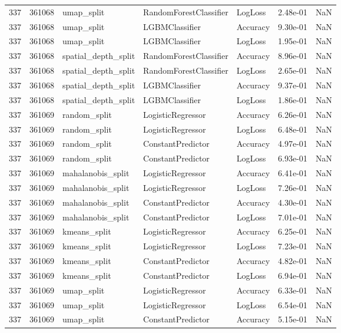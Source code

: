 \begin{tabular}{rrlllrr}
337 & 361068 & umap\_split & RandomForestClassifier & LogLoss & 2.48e-01 & NaN \\
337 & 361068 & umap\_split & LGBMClassifier & Accuracy & 9.30e-01 & NaN \\
337 & 361068 & umap\_split & LGBMClassifier & LogLoss & 1.95e-01 & NaN \\
337 & 361068 & spatial\_depth\_split & RandomForestClassifier & Accuracy & 8.96e-01 & NaN \\
337 & 361068 & spatial\_depth\_split & RandomForestClassifier & LogLoss & 2.65e-01 & NaN \\
337 & 361068 & spatial\_depth\_split & LGBMClassifier & Accuracy & 9.37e-01 & NaN \\
337 & 361068 & spatial\_depth\_split & LGBMClassifier & LogLoss & 1.86e-01 & NaN \\
337 & 361069 & random\_split & LogisticRegressor & Accuracy & 6.26e-01 & NaN \\
337 & 361069 & random\_split & LogisticRegressor & LogLoss & 6.48e-01 & NaN \\
337 & 361069 & random\_split & ConstantPredictor & Accuracy & 4.97e-01 & NaN \\
337 & 361069 & random\_split & ConstantPredictor & LogLoss & 6.93e-01 & NaN \\
337 & 361069 & mahalanobis\_split & LogisticRegressor & Accuracy & 6.41e-01 & NaN \\
337 & 361069 & mahalanobis\_split & LogisticRegressor & LogLoss & 7.26e-01 & NaN \\
337 & 361069 & mahalanobis\_split & ConstantPredictor & Accuracy & 4.30e-01 & NaN \\
337 & 361069 & mahalanobis\_split & ConstantPredictor & LogLoss & 7.01e-01 & NaN \\
337 & 361069 & kmeans\_split & LogisticRegressor & Accuracy & 6.25e-01 & NaN \\
337 & 361069 & kmeans\_split & LogisticRegressor & LogLoss & 7.23e-01 & NaN \\
337 & 361069 & kmeans\_split & ConstantPredictor & Accuracy & 4.82e-01 & NaN \\
337 & 361069 & kmeans\_split & ConstantPredictor & LogLoss & 6.94e-01 & NaN \\
337 & 361069 & umap\_split & LogisticRegressor & Accuracy & 6.33e-01 & NaN \\
337 & 361069 & umap\_split & LogisticRegressor & LogLoss & 6.54e-01 & NaN \\
337 & 361069 & umap\_split & ConstantPredictor & Accuracy & 5.15e-01 & NaN \\

\end{tabular}
